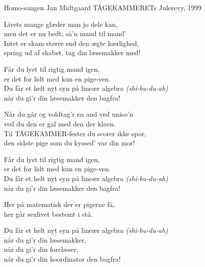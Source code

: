 \begin{song}{Homo-sangen}
  {} %
  {\SBOrgMel} %
  {Jan Midtgaard} %
  {TÅGEKAMMERETs Julerevy, 1999} %
  {\NotCCLIed} %

  \begin{SBVerse}
    Livets mange glæder man jo dele kan,\\
    men det er nu bedt, så'n mand til mand'\\
    Intet er skam større end den ægte kærlighed,\\
    spring ud af skabet, tag din læsemakker med!
  \end{SBVerse}

  \begin{SBChorus}
    Får du lyst til rigtig mand igen,\\
    er det for lidt med kun en pige-ven.\\
    Du får et helt nyt syn på lineær algebra \emph{(shi-bu-du-ah)}\\
    når du gi’r din læsemakker den bagfra!
  \end{SBChorus}

  \begin{SBVerse}
    Når du går og voldtag’r en and ved unisø’n\\
    ved du den er gal med den der kløen.\\
    Til TÅGEKAMMER-fester du scorer ikke spor,\\
    den sidste pige som du kyssed’ var din mor!
  \end{SBVerse}

  \begin{SBChorus}
    Får du lyst til rigtig mand igen,\\
    er det for lidt med kun en pige-ven.\\
    Du får et helt nyt syn på lineær algebra \emph{(shi-bu-du-ah)}\\
    når du gi’r din læsemakker den bagfra!
  \end{SBChorus}


  \begin{SBSection*}
    Her på matematisk der er pigerne få,\\
    her går sexlivet bestemt i stå.
  \end{SBSection*}

  \begin{SBChorus}
    Du får et helt nyt syn på lineær algebra \emph{(shi-bu-du-ah)}\\
    når du gi’r din læsemakker,\\
    når du gi'r din forelæser,\\
    når du gi'r din koordinator den bagfra!
  \end{SBChorus}
\end{song}